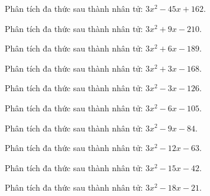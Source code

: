 \begin{bt}
	Phân tích đa thức sau thành nhân tử: $3 x^2 - 45 x + 162$.
\end{bt}
\begin{bt}
	Phân tích đa thức sau thành nhân tử: $3 x^2 + 9 x - 210$.
\end{bt}
\begin{bt}
	Phân tích đa thức sau thành nhân tử: $3 x^2 + 6 x - 189$.
\end{bt}
\begin{bt}
	Phân tích đa thức sau thành nhân tử: $3 x^2 + 3 x - 168$.
\end{bt}
\begin{bt}
	Phân tích đa thức sau thành nhân tử: $3 x^2 - 3 x - 126$.
\end{bt}
\begin{bt}
	Phân tích đa thức sau thành nhân tử: $3 x^2 - 6 x - 105$.
\end{bt}
\begin{bt}
	Phân tích đa thức sau thành nhân tử: $3 x^2 - 9 x - 84$.
\end{bt}
\begin{bt}
	Phân tích đa thức sau thành nhân tử: $3 x^2 - 12 x - 63$.
\end{bt}
\begin{bt}
	Phân tích đa thức sau thành nhân tử: $3 x^2 - 15 x - 42$.
\end{bt}
\begin{bt}
	Phân tích đa thức sau thành nhân tử: $3 x^2 - 18 x - 21$.
\end{bt}
